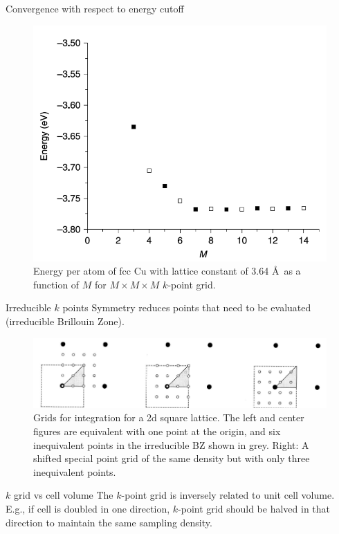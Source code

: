 \documentclass[aspectratio=169]{beamer}
\begin{document}
    \begin{frame}{Convergence with respect to energy cutoff}
        \begin{figure}
            \centering
            \includegraphics[width=0.4\linewidth]{lectures/figures/7_convergence_kpoint.png}
            \caption{Energy per atom of fcc Cu with lattice constant of 3.64 \AA~as a function of $M$ for $M \times M \times M$ $k$-point grid.\cite{shollDensityFunctionalTheory2009}}
        \end{figure}
    \end{frame}


    \begin{frame}{Irreducible $k$ points}
        Symmetry reduces points that need to be evaluated (irreducible Brillouin Zone).
        \begin{figure}
            \centering
            \includegraphics[width=0.6\linewidth]{lectures/figures/7_irr_BZ.png}
            \caption{Grids for integration for a 2d square lattice. The left and center figures are equivalent with one point at the origin, and six inequivalent points in the irreducible BZ shown in grey. Right: A shifted special point grid of the same density but with only three inequivalent points. \cite{shollDensityFunctionalTheory2009}}
        \end{figure}
        \begin{alertblock}{$k$ grid vs cell volume}
            The $k$-point grid is inversely related to unit cell volume. E.g., if cell is doubled in one direction, $k$-point grid should be halved in that direction to maintain the same sampling density.
        \end{alertblock}

    \end{frame}
\end{document}
